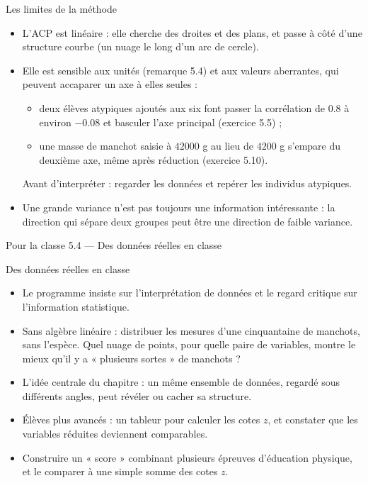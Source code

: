 \begin{frame}{Les limites de la méthode}
  \begin{itemize}
    \item L'ACP est linéaire : elle cherche des droites et des plans, et
      passe à côté d'une structure courbe (un nuage le long d'un arc de
      cercle).
    \item Elle est sensible aux unités (remarque 5.4) et aux valeurs
      aberrantes, qui peuvent accaparer un axe à elles seules :
      \begin{itemize}
        \item deux élèves atypiques ajoutés aux six font passer la
          corrélation de $\num{0.8}$ à environ $-\num{0.08}$ et basculer
          l'axe principal (exercice 5.5) ;
        \item une masse de manchot saisie à $\num{42000}$ g au lieu de
          $\num{4200}$ g s'empare du deuxième axe, même après réduction
          (exercice 5.10).
      \end{itemize}
      Avant d'interpréter : regarder les données et repérer les individus
      atypiques.
    \item Une grande variance n'est pas toujours une information
      intéressante : la direction qui sépare deux groupes peut être une
      direction de faible variance.
  \end{itemize}
\end{frame}

\begin{frame}{Pour la classe 5.4 --- Des données réelles en classe}
  \begin{Classe}{Des données réelles en classe}
    \small
    \begin{itemize}
      \item Le programme insiste sur l'interprétation de données et le regard
        critique sur l'information statistique.
      \item Sans algèbre linéaire : distribuer les mesures d'une cinquantaine
        de manchots, sans l'espèce. Quel nuage de points, pour quelle paire
        de variables, montre le mieux qu'il y a « plusieurs sortes » de
        manchots ?
      \item L'idée centrale du chapitre : un même ensemble de données,
        regardé sous différents angles, peut révéler ou cacher sa structure.
      \item Élèves plus avancés : un tableur pour calculer les cotes $z$, et
        constater que les variables réduites deviennent comparables.
      \item Construire un « score » combinant plusieurs épreuves d'éducation
        physique, et le comparer à une simple somme des cotes $z$.
    \end{itemize}
  \end{Classe}
\end{frame}
